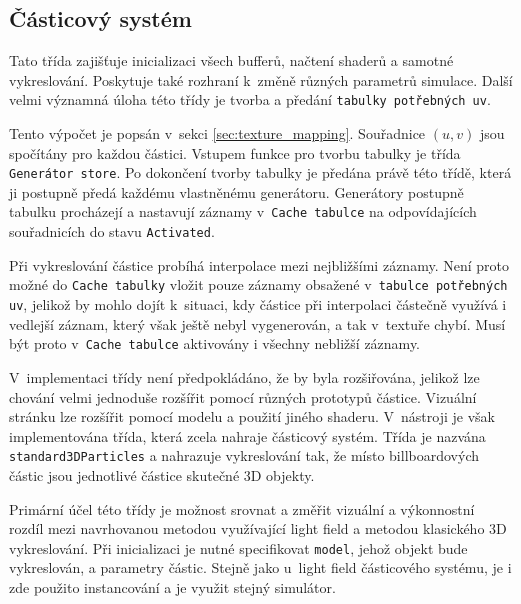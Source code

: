    
\subsection{Částicový systém}
\label{sec:impl_particles}
Tato třída zajišťuje inicializaci všech bufferů, načtení shaderů a samotné vykreslování. Poskytuje také rozhraní k~změně různých parametrů simulace. Další velmi významná úloha této třídy je tvorba a předání \texttt{tabulky potřebných uv}.

Tento výpočet je popsán v~sekci \ref{sec:texture_mapping}. Souřadnice $(u,v)$ jsou spočítány pro každou částici. Vstupem funkce pro tvorbu tabulky je třída \texttt{Generátor store}. Po dokončení tvorby tabulky je předána právě této třídě, která ji postupně předá každému vlastněnému generátoru. Generátory postupně tabulku procházejí a nastavují záznamy v~\texttt{Cache tabulce} na odpovídajících souřadnicích do stavu \texttt{Activated}. 

Při vykreslování částice probíhá interpolace mezi nejbližšími záznamy. Není proto možné do \texttt{Cache tabulky} vložit pouze záznamy obsažené v~\texttt{tabulce potřebných uv}, jelikož by mohlo dojít k~situaci, kdy částice při interpolaci částečně využívá i vedlejší záznam, který však ještě nebyl vygenerován, a tak v~textuře chybí. Musí být proto v~\texttt{Cache tabulce} aktivovány i všechny nebližší záznamy.

V~implementaci třídy není předpokládáno, že by byla rozšiřována, jelikož lze chování velmi jednoduše rozšířit pomocí různých prototypů částice. Vizuální stránku lze rozšířit pomocí modelu a použití jiného shaderu. V~nástroji je však implementována třída, která zcela nahraje částicový systém. Třída je nazvána \texttt{standard3DParticles} a nahrazuje vykreslování tak, že místo billboardových částic jsou jednotlivé částice skutečné 3D objekty. 

Primární účel této třídy je možnost srovnat a změřit vizuální a výkonnostní rozdíl mezi navrhovanou metodou využívající light field a metodou klasického 3D vykreslování. Při inicializaci je nutné specifikovat \texttt{model}, jehož objekt bude vykreslován, a parametry částic. Stejně jako u~light field částicového systému, je i zde použito instancování a je využit stejný simulátor.   
